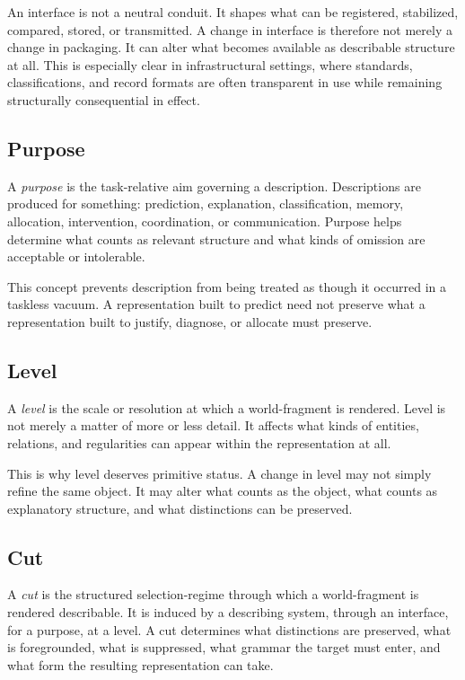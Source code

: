 \documentclass[11pt]{article}
\renewcommand{\emph}[1]{\textit{#1}}
\begin{document}
An interface is not a neutral conduit. It shapes what can be registered, stabilized, compared, stored, or transmitted. A change in interface is therefore not merely a change in packaging. It can alter what becomes available as describable structure at all. This is especially clear in infrastructural settings, where standards, classifications, and record formats are often transparent in use while remaining structurally consequential in effect. \cite{star_ethnography_of_infrastructure,bowker_star_sorting_things_out}

\subsection{Purpose}

A \emph{purpose} is the task-relative aim governing a description. Descriptions are produced for something: prediction, explanation, classification, memory, allocation, intervention, coordination, or communication. Purpose helps determine what counts as relevant structure and what kinds of omission are acceptable or intolerable.

This concept prevents description from being treated as though it occurred in a taskless vacuum. A representation built to predict need not preserve what a representation built to justify, diagnose, or allocate must preserve.

\subsection{Level}

A \emph{level} is the scale or resolution at which a world-fragment is rendered. Level is not merely a matter of more or less detail. It affects what kinds of entities, relations, and regularities can appear within the representation at all. \cite{levels_org_biology_sep}

This is why level deserves primitive status. A change in level may not simply refine the same object. It may alter what counts as the object, what counts as explanatory structure, and what distinctions can be preserved.

\subsection{Cut}

A \emph{cut} is the structured selection-regime through which a world-fragment is rendered describable. It is induced by a describing system, through an interface, for a purpose, at a level. A cut determines what distinctions are preserved, what is foregrounded, what is suppressed, what grammar the target must enter, and what form the resulting representation can take.
\end{document}
